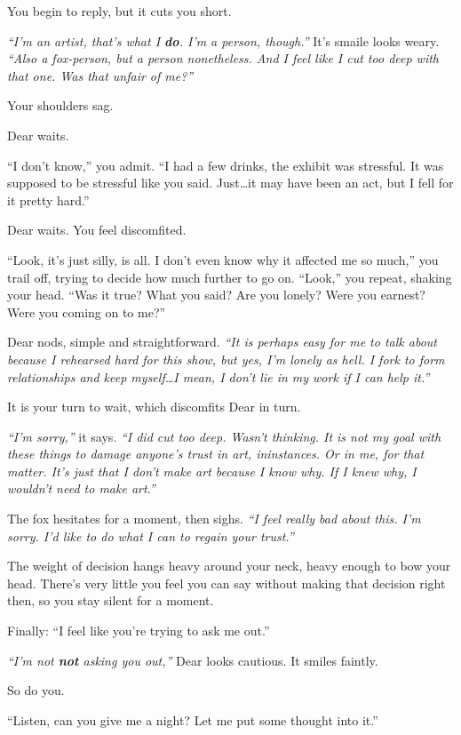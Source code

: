 You begin to reply, but it cuts you short.

\emph{``I'm an artist, that's what I \textbf{do}. I'm a person, though.''} It's smaile looks weary. \emph{``Also a fox-person, but a person nonetheless. And I feel like I cut too deep with that one. Was that unfair of me?''}

Your shoulders sag.

Dear waits.

``I don't know,'' you admit. ``I had a few drinks, the exhibit was stressful. It was supposed to be stressful like you said. Just\ldots{}it may have been an act, but I fell for it pretty hard.''

Dear waits. You feel discomfited.

``Look, it's just silly, is all. I don't even know why it affected me so much,'' you trail off, trying to decide how much further to go on. ``Look,'' you repeat, shaking your head. ``Was it true? What you said? Are you lonely? Were you earnest? Were you coming on to me?''

Dear nods, simple and straightforward. \emph{``It is perhaps easy for me to talk about because I rehearsed hard for this show, but yes, I'm lonely as hell. I fork to form relationships and keep myself\ldots{}I mean, I don't lie in my work if I can help it.''}

It is your turn to wait, which discomfits Dear in turn.

\emph{``I'm sorry,''} it says. \emph{``I did cut too deep. Wasn't thinking. It is not my goal with these things to damage anyone's trust in art, ininstances. Or in me, for that matter. It's just that I don't make art because I know why. If I knew why, I wouldn't need to make art.''}

The fox hesitates for a moment, then sighs. \emph{``I feel really bad about this. I'm sorry. I'd like to do what I can to regain your trust.''}

The weight of decision hangs heavy around your neck, heavy enough to bow your head. There's very little you feel you can say without making that decision right then, so you stay silent for a moment.

Finally: ``I feel like you're trying to ask me out.''

\emph{``I'm not \textbf{not} asking you out,''} Dear looks cautious. It smiles faintly.

So do you.

``Listen, can you give me a night? Let me put some thought into it.''

